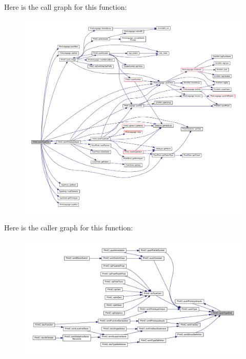 Here is the call graph for this function\+:
\nopagebreak
\begin{figure}[H]
\begin{center}
\leavevmode
\includegraphics[width=350pt]{class_print_c_a45d0e43f9f4e91353db9aeb4c053deaa_cgraph}
\end{center}
\end{figure}
Here is the caller graph for this function\+:
\nopagebreak
\begin{figure}[H]
\begin{center}
\leavevmode
\includegraphics[width=350pt]{class_print_c_a45d0e43f9f4e91353db9aeb4c053deaa_icgraph}
\end{center}
\end{figure}
\mbox{\label{class_print_c_a0b96904bf7b1ecfb6b254c51707ae21a}} 

